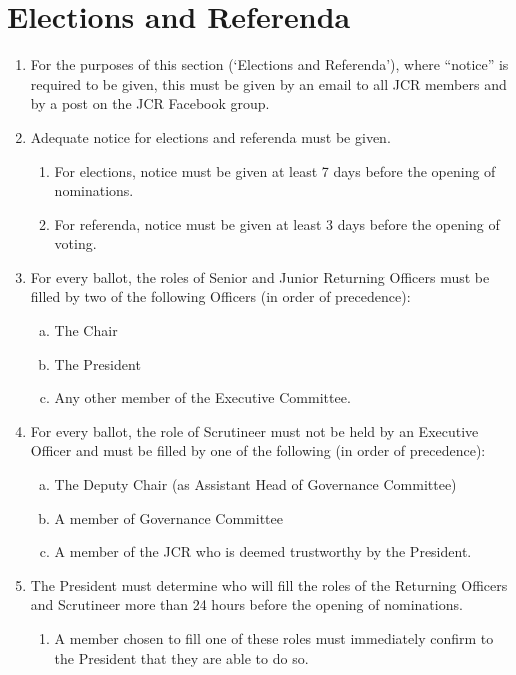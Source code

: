 \documentclass[12pt]{article}
\begin{document}
\section{Elections and Referenda}
\begin{enumerate}
    \item For the purposes of this section (`Elections and Referenda'), where ``notice'' is required to be given, this must be given by an email to all JCR members and by a post on the JCR Facebook group.
    \item Adequate notice for elections and referenda must be given.
    \begin{enumerate}
        \item For elections, notice must be given at least 7 days before the opening of nominations.
        \item For referenda, notice must be given at least 3 days before the opening of voting.
    \end{enumerate}
    \item For every ballot, the roles of Senior and Junior Returning Officers must be filled by two of the following Officers (in order of precedence):
    \begin{enumerate}[(a)]
        \item The Chair
        \item The President
        \item Any other member of the Executive Committee.
    \end{enumerate}
    \item For every ballot, the role of Scrutineer must not be held by an Executive Officer and must be filled by one of the following (in order of precedence):
    \begin{enumerate}[(a)]
        \item The Deputy Chair (as Assistant Head of Governance Committee)
        \item A member of Governance Committee
        \item A member of the JCR who is deemed trustworthy by the President.
    \end{enumerate}
    \item The President must determine who will fill the roles of the Returning Officers and Scrutineer more than 24 hours before the opening of nominations.
    \begin{enumerate}
        \item A member chosen to fill one of these roles must immediately confirm to the President that they are able to do so.

\end{enumerate}
\end{enumerate}
\end{document}
